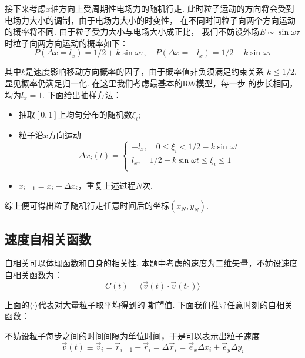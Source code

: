 \documentclass[12pt,a4paper,utf8]{ctexart}
\begin{document}
接下来考虑$x$轴方向上受周期性电场力的随机行走.
此时粒子运动的方向将会受到电场力大小的调制，由于电场力大小的时变性，
在不同时间粒子向两个方向运动的概率将不同. 由于粒子受力大小与电场大小成正比，
我们不妨设外场$E \sim \sin \omega \tau$时粒子向两方向运动的概率如下：
\begin{equation}
    P(\Delta x = l_x) = 1/2 + k \sin \omega \tau, \quad 
    P(\Delta x = -l_x) = 1/2 - k \sin \omega \tau 
\end{equation}

其中$k$是速度影响移动方向概率的因子，由于概率值非负须满足约束关系
$k \leq 1/2$. 显见概率仍满足归一化. 在这里我们考虑最基本的RW模型，每一步
的步长相同，均为$l_x = 1$. 下面给出抽样方法：
\begin{itemize}
    \item 抽取$[0,1]$上均匀分布的随机数$\xi_i$;
    \item 粒子沿$x$方向运动
        \begin{equation}
            \Delta x_i(t) = 
            \begin{cases}
                - l_x, \quad 0 \leq \xi_i < 1/2 - k\sin \omega t \\
                l_x, \quad 1/2 - k \sin \omega t \leq \xi_i \leq 1 \\
            \end{cases}
        \end{equation}
    \item $x_{i+1} = x_i + \Delta x_i$，重复上述过程$N$次.
\end{itemize}

综上便可得出粒子随机行走任意时间后的坐标$(x_N,y_N)$.
\subsection{速度自相关函数}

自相关可以体现函数和自身的相关性. 
本题中考虑的速度为二维矢量，不妨设速度自相关函数为：
\begin{equation}
    C(t) = \langle \vec{v}(t) \cdot 
    \vec{v}(t_0) \rangle
\end{equation}

上面的$ \langle \cdot  \rangle $代表对大量粒子取平均得到的
期望值.
下面我们推导任意时刻的自相关函数：

不妨设粒子每步之间的时间间隔为单位时间，于是可以表示出粒子速度
\begin{equation}
    \vec{v}(t) \equiv \vec{v}_i = \vec{r}_{i+1} - \vec{r}_i = \Delta \vec{r}_i
    = \vec{e}_x \Delta x_i  + \vec{e}_y \Delta y_i
\end{equation}
\end{document}

